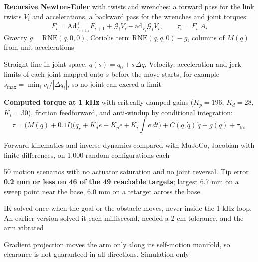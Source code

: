 \documentclass[letterpaper,11pt]{article}
\begin{document}
{\begin{points}
  \item {} \textbf{Recursive Newton-Euler} with twists and wrenches: a forward pass for the link twists $V_i$ and accelerations, a backward pass for the wrenches and joint torques:
  \[ F_i = \mathrm{Ad}^{\top}_{T_{i+1,i}} F_{i+1} + \mathcal{G}_i \dot V_i - \mathrm{ad}^{\top}_{V_i} \mathcal{G}_i V_i, \qquad \tau_i = F_i^{\top} A_i \]
  Gravity $g = \mathrm{RNE}(q, 0, 0)$, Coriolis term $\mathrm{RNE}(q, \dot q, 0) - g$, columns of $M(q)$ from unit accelerations
  \item {} Straight line in joint space, $q(s) = q_0 + s\,\Delta q$. Velocity, acceleration and jerk limits of each joint mapped onto $s$ before the move starts, for example $\dot s_{\max} = \min_i v_i / |\Delta q_i|$, so no joint can exceed a limit
  \item {} \textbf{Computed torque at 1 kHz} with critically damped gains ($K_p = 196$, $K_d = 28$, $K_i = 30$), friction feedforward, and anti-windup by conditional integration:
  \[ \tau = \big(M(q) + 0.1 I\big)\Big(\ddot q_r + K_d \dot e + K_p e + K_i\!\int\! e\, dt\Big) + C(q, \dot q)\,\dot q + g(q) + \tau_{\mathrm{fric}} \]
  \item {} Forward kinematics and inverse dynamics compared with MuJoCo, Jacobian with finite differences, on 1,000 random configurations each
  \item {} 50 motion scenarios with no actuator saturation and no joint reversal. Tip error \textbf{0.2 mm or less on 46 of the 49 reachable targets}; largest 6.7 mm on a sweep point near the base, 6.0 mm on a retarget across the base
  \item {} IK solved once when the goal or the obstacle moves, never inside the 1 kHz loop. An earlier version solved it each millisecond, needed a 2 cm tolerance, and the arm vibrated
  \item {} Gradient projection moves the arm only along its self-motion manifold, so clearance is not guaranteed in all directions. Simulation only
\end{points}
}
\end{document}
